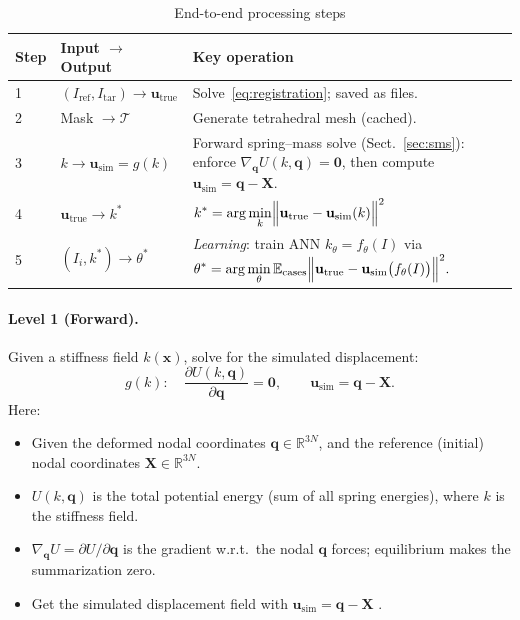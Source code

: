 \documentclass{article}
\begin{document}
\begin{table}[h]
\centering
\caption{End-to-end processing steps}
\label{tab:pipeline}
\begin{tabular}{@{}p{1.5cm}p{4.5cm}p{7.5cm}@{}}
\toprule
\textbf{Step} & \textbf{Input \(\to\) Output} & \textbf{Key operation} \\
\midrule
1 & \((I_{\mathrm{ref}},I_{\mathrm{tar}})\to\mathbf{u}_{\mathrm{true}}\) &
 Solve~\eqref{eq:registration}; saved as files. \\[0.4em]
2 & Mask \(\to \mathcal{T}\) &
 Generate tetrahedral mesh (cached). \\[0.4em]
3 & \(k \to \mathbf{u}_{\mathrm{sim}} = g(k)\) &
 Forward spring–mass solve (Sect.~\ref{sec:sms}):  
 enforce \(\nabla_{\mathbf{q}}U(k,\mathbf{q}) = \mathbf{0}\),  
 then compute \(\mathbf{u}_{\mathrm{sim}} = \mathbf{q} - \mathbf{X}.\) \\[0.4em]
4 & \(\mathbf{u}_{\mathrm{true}}\to k^*\) &  
 \(\displaystyle
   k^* = \arg\min_k \Bigl\lVert \mathbf{u}_{\mathrm{true}}
   - \mathbf{u}_{\mathrm{sim}}(k)\Bigr\rVert^2
 \)\\[0.8em]
5 & \((I_i, k^*)\to \theta^*\) &
 \emph{Learning}: train ANN \(k_\theta = f_\theta(I)\) via
 \(\displaystyle
   \theta^* = \arg\min_\theta 
   \mathbb{E}_{\mathrm{cases}}
   \Bigl\lVert \mathbf{u}_{\mathrm{true}}
   - \mathbf{u}_{\mathrm{sim}}\bigl(f_\theta(I)\bigr)\Bigr\rVert^2.
 \) \\
\bottomrule
\end{tabular}
\end{table}


\paragraph{Level 1 (Forward).}
Given a stiffness field \(k(\mathbf{x})\), solve for the simulated displacement:
\[
  g(k):\quad
  \frac{\partial U(k,\mathbf{q})}{\partial \mathbf{q}} = \mathbf{0},
  \qquad
  \mathbf{u}_{\mathrm{sim}} = \mathbf{q} - \mathbf{X}.
\]
Here:
\begin{itemize}
  \item Given the deformed nodal coordinates \(\mathbf{q}\in\mathbb{R}^{3N}\), 
  and the reference (initial) nodal coordinates \(\mathbf{X}\in\mathbb{R}^{3N}\).
  \item \(U(k,\mathbf{q})\) is the total potential energy (sum of all spring energies), 
  where $k$ is the stiffness field. 
  
  \item \(\nabla_{\mathbf{q}}U = \partial U/\partial \mathbf{q}\) is the gradient w.r.t.\, the nodal  \(\mathbf{q}\) forces; equilibrium makes the summarization zero.
  \item Get the simulated displacement field with \(\mathbf{u}_{\mathrm{sim}} = \mathbf{q}-\mathbf{X}\) .
\end{itemize}
\end{document}
